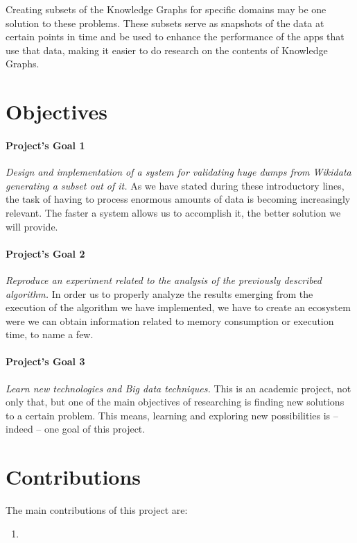 Creating subsets of the Knowledge Graphs for specific domains may be one solution to these problems. These subsets serve as snapshots of the data at certain points in time and be used to enhance the performance of the apps that use that data, making it easier to do research on the contents of Knowledge Graphs.

\section{Objectives}

\paragraph{Project's Goal 1}
\textit{Design and implementation of a system for validating huge dumps from Wikidata generating a subset out of it.} As we have stated during these introductory lines, the task of having to process enormous amounts of data is becoming increasingly relevant. The faster a system allows us to accomplish it, the better solution we will provide.

\paragraph{Project's Goal 2}
\textit{Reproduce an experiment related to the analysis of the previously described algorithm.} In order us to properly analyze the results emerging from the execution of the algorithm we have implemented, we have to create an ecosystem were we can obtain information related to memory consumption or execution time, to name a few.

\paragraph{Project's Goal 3}
\textit{Learn new technologies and Big data techniques.} This is an academic project, not only that, but one of the main objectives of researching is finding new solutions to a certain problem. This means, learning and exploring new possibilities is -- indeed -- one goal of this project.

\section{Contributions}

The main contributions of this project are:

\begin{enumerate}
    \item
\end{enumerate}

